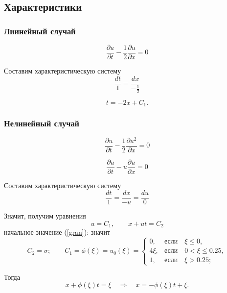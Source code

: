 \newpage
\subsection{Характеристики}

\subsubsection{Лиинейный случай}
\[
\frac{\partial u}{\partial t} - \frac{1}{2}
\frac{\partial u}{\partial x} = 0
\]

Составим характеристическую систему
\[
\frac{dt}{1} = \frac{dx}{ - \frac{1}{2}} 
\]

\begin{equation}\label{harr_lin}
t = -2x + C_1.
\end{equation}


\subsubsection{Нелинейный случай}
\[
\frac{\partial u}{\partial t} - \frac{1}{2}
\frac{\partial u^2}{\partial x} = 0
\]

\[
\frac{\partial u}{\partial t} - u
\frac{\partial u}{\partial x} = 0
\]

Составим характеристическую систему
\[
\frac{dt}{1} = \frac{dx}{-u} = \frac{du}{0}
\]

Значит, получим уравнения
\[
u = C_1, \qquad x + u t = C_2
\]
начальное значение (\ref{gran}):
значит 
\[
C_2 =  \sigma;\qquad
C_1 = \phi(\xi) = u_0(\xi)= 
\begin{cases}
0,& \text{если} \quad \xi \le 0, \\
4\xi,& \text{если} \quad 0 < \xi \le 0.25, \\
1,& \text{если} \quad \xi > 0.25;
\end{cases}
\]

Тогда
\begin{equation}\label{harr_nonlin}
x + \phi(\xi)t = \xi \quad \Longrightarrow \quad x = -\phi(\xi)t + \xi.
\end{equation}